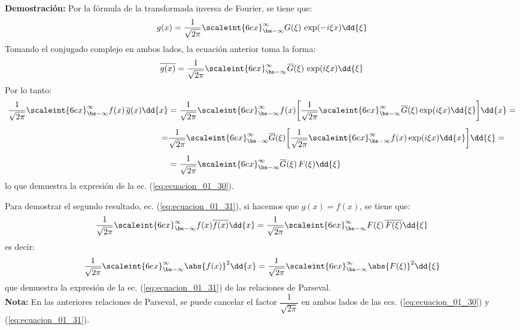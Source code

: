 \noindent
\textbf{Demostración:} Por la fórmula de la transformada inversa de Fourier, se tiene que:
\begin{align*}
g(x) = \dfrac{1}{\sqrt{2 \pi}} \scaleint{6ex}_{\bs -\infty}^{\infty} G(\xi) \, \exp(-i \xi x) \dd{\xi}
\end{align*}
Tomando el conjugado complejo en ambos lados, la ecuación anterior toma la forma:
\begin{align*}
\overline{g(x)} = \dfrac{1}{\sqrt{2 \pi}} \scaleint{6ex}_{\bs -\infty}^{\infty} \overline{G}(\xi) \, \exp(i \xi x) \dd{\xi}
\end{align*}
Por lo tanto:
\begin{align*}
\dfrac{1}{\sqrt{2 \pi}} \scaleint{6ex}_{\bs -\infty}^{\infty} f(x) \, \overline{g}(x) \dd{x} &= \dfrac{1}{\sqrt{2 \pi}} \scaleint{6ex}_{\bs -\infty}^{\infty} f(x) \bigg[ \dfrac{1}{\sqrt{2 \pi}} \scaleint{6ex}_{\bs -\infty}^{\infty} \overline{G} (\xi) \exp(i \xi x) \dd{\xi} \bigg] \dd{x} = \\[0.5em]
=& \dfrac{1}{\sqrt{2 \pi}} \scaleint{6ex}_{\bs -\infty}^{\infty} \overline{G} (\xi) \bigg[ \dfrac{1}{\sqrt{2 \pi}} \scaleint{6ex}_{\bs -\infty}^{\infty} f(x) \exp(i \xi x) \dd{x} \bigg] \dd{\xi} = \\[0.5em]
&= \dfrac{1}{\sqrt{2 \pi}} \scaleint{6ex}_{\bs -\infty}^{\infty} \overline{G} (\xi) \, F(\xi) \dd{\xi}
\end{align*}
lo que demuestra la expresión de la ec. (\ref{eq:ecuacion_01_30}).
\par
Para demostrar el segundo resultado, ec. (\ref{eq:ecuacion_01_31}), si hacemos que $g(x) = f(x)$, se tiene que:
\begin{align*}
\dfrac{1}{\sqrt{2 \pi}} \scaleint{6ex}_{\bs -\infty}^{\infty} f(x) \overline{f (x)} \dd{x} = \dfrac{1}{\sqrt{2 \pi}} \scaleint{6ex}_{\bs -\infty}^{\infty} F (\xi) \, \overline{F (\xi)} \dd{\xi}
\end{align*}
es decir:
\begin{align*}
\dfrac{1}{\sqrt{2 \pi}} \scaleint{6ex}_{\bs -\infty}^{\infty} \abs{f(x)}^2 \dd{x} = \dfrac{1}{\sqrt{2 \pi}} \scaleint{6ex}_{\bs -\infty}^{\infty} \abs{F(\xi)}^{2} \dd{\xi}
\end{align*}
que demuestra la expresión de la ec. (\ref{eq:ecuacion_01_31}) de las relaciones de Parseval.
\\
\noindent
\textbf{Nota: } En las anteriores relaciones de Parseval, se puede cancelar el factor $\dfrac{1}{\sqrt{2 \pi}}$ en ambos lados de las ecs. (\ref{eq:ecuacion_01_30}) y (\ref{eq:ecuacion_01_31}).
\\[0.5em]
